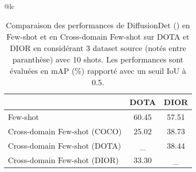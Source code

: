 \begin{table}[h]

    \label{tab:comparisonfscd}
    \begin{adjustbox}{width=0.75\textwidth}
        \begin{tabular}{@{}lc}
            \begin{tabular}{@{}lcc}
                \toprule[1pt]
                & \textbf{DOTA} & \textbf{DIOR} \\ \hline
                Few-shot              & 60.45         & 57.51         \\ \hline
                Cross-domain Few-shot (COCO) & 25.02         & 38.73         \\
                Cross-domain Few-shot (DOTA) & \_         & 38.44         \\
                Cross-domain Few-shot (DIOR) & 33.30         & \_         \\\bottomrule[1pt]
            \end{tabular}%
        \end{tabular}%
    \end{adjustbox}
    \caption{Comparaison des performances de DiffusionDet (\cite{chen2022diffusiondet}) en Few-shot et en Cross-domain Few-shot sur DOTA et DIOR en considérant 3 dataset source (notés entre paranthèse) avec 10 shots.
    Les performances sont évaluées en mAP (\%) rapporté avec un seuil IoU à 0.5.}

\end{table}